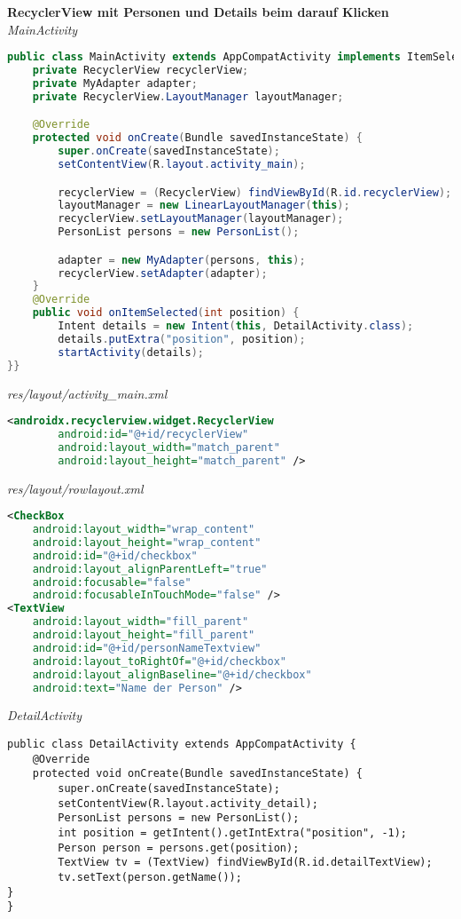 \textbf{RecyclerView mit Personen und Details beim darauf Klicken} \\
\textit{MainActivity}
\begin{lstlisting}[language=java]
public class MainActivity extends AppCompatActivity implements ItemSelectionListener{
    private RecyclerView recyclerView;
    private MyAdapter adapter;
    private RecyclerView.LayoutManager layoutManager;

    @Override
    protected void onCreate(Bundle savedInstanceState) {
        super.onCreate(savedInstanceState);
        setContentView(R.layout.activity_main);

        recyclerView = (RecyclerView) findViewById(R.id.recyclerView);
        layoutManager = new LinearLayoutManager(this);
        recyclerView.setLayoutManager(layoutManager);
        PersonList persons = new PersonList();

        adapter = new MyAdapter(persons, this);
        recyclerView.setAdapter(adapter);
    }
    @Override
    public void onItemSelected(int position) {
        Intent details = new Intent(this, DetailActivity.class);
        details.putExtra("position", position);
        startActivity(details);
}}
\end{lstlisting}
\textit{res/layout/activity\_main.xml} \\
\begin{lstlisting}[language=xml]
<androidx.recyclerview.widget.RecyclerView
        android:id="@+id/recyclerView"
        android:layout_width="match_parent"
        android:layout_height="match_parent" />
\end{lstlisting}
\textit{res/layout/rowlayout.xml} \\
\begin{lstlisting}[language=xml]
 <CheckBox
    android:layout_width="wrap_content"
    android:layout_height="wrap_content"
    android:id="@+id/checkbox"
    android:layout_alignParentLeft="true"
    android:focusable="false"
    android:focusableInTouchMode="false" />
<TextView
    android:layout_width="fill_parent"
    android:layout_height="fill_parent"
    android:id="@+id/personNameTextview"
    android:layout_toRightOf="@+id/checkbox"
    android:layout_alignBaseline="@+id/checkbox"
    android:text="Name der Person" />
\end{lstlisting}

\textit{DetailActivity}
\begin{lstlisting}[lanuage=java]
public class DetailActivity extends AppCompatActivity {
    @Override
    protected void onCreate(Bundle savedInstanceState) {
        super.onCreate(savedInstanceState);
        setContentView(R.layout.activity_detail);
        PersonList persons = new PersonList();
        int position = getIntent().getIntExtra("position", -1);
        Person person = persons.get(position);
        TextView tv = (TextView) findViewById(R.id.detailTextView);
        tv.setText(person.getName());
}
}
\end{lstlisting}

